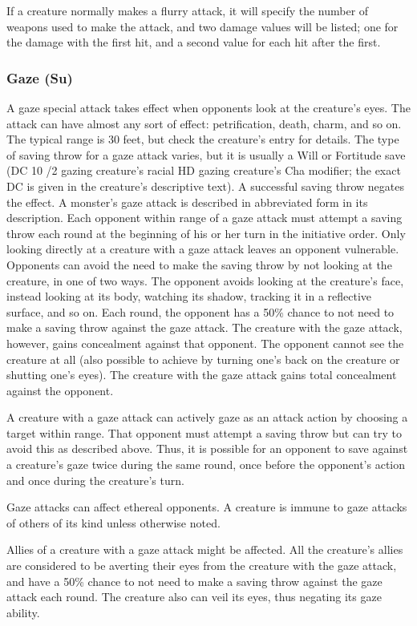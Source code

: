 {If a creature normally makes a flurry attack, it will specify the number of weapons used to make the attack, and two damage values will be listed; one for the damage with the first hit, and a second value for each hit after the first.


\subsubsection{Gaze (Su)} A gaze special attack takes effect when opponents look at the creature's eyes. The attack can have almost any sort of effect: petrification, death, charm, and so on. The typical range is 30 feet, but check the creature's entry for details. The type of saving throw for a gaze attack varies, but it is usually a Will or Fortitude save (DC 10 /2 gazing creature's racial HD \add gazing creature's Cha modifier; the exact DC is given in the creature's descriptive text). A successful saving throw negates the effect. A monster's gaze attack is described in abbreviated form in its description. Each opponent within range of a gaze attack must attempt a saving throw each round at the beginning of his or her turn in the initiative order. Only looking directly at a creature with a gaze attack leaves an opponent vulnerable. Opponents can avoid the need to make the saving throw by not looking at the creature, in one of two ways. 
 The opponent avoids looking at the creature's face, instead looking at its body, watching its shadow, tracking it in a reflective surface, and so on. Each round, the opponent has a 50\% chance to not need to make a saving throw against the gaze attack. The creature with the gaze attack, however, gains concealment against that opponent.
 The opponent cannot see the creature at all (also possible to achieve by turning one's back on the creature or shutting one's eyes). The creature with the gaze attack gains total concealment against the opponent. 
\par A creature with a gaze attack can actively gaze as an attack action by choosing a target within range. That opponent must attempt a saving throw but can try to avoid this as described above. Thus, it is possible for an opponent to save against a creature's gaze twice during the same round, once before the opponent's action and once during the creature's turn. 
\par Gaze attacks can affect ethereal opponents. A creature is immune to gaze attacks of others of its kind unless otherwise noted.
\par Allies of a creature with a gaze attack might be affected. All the creature's allies are considered to be averting their eyes from the creature with the gaze attack, and have a 50\% chance to not need to make a saving throw against the gaze attack each round. The creature also can veil its eyes, thus negating its gaze ability.

}
